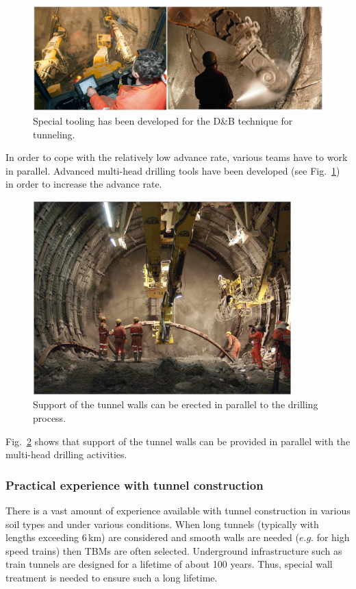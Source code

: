 \begin{figure}[htbp!]
\centering
\includegraphics[width=16cm]{./Sec_SiteInfra/Figures/multihead.jpg}
\caption{Special tooling has been developed for the D\&B technique for tunneling.}
\label{fig:multihead}
\end{figure}
In order to cope with the relatively low advance rate, various teams
have to work in parallel. Advanced multi-head drilling tools have been
developed (see Fig.~\ref{fig:multihead}) in order to increase the advance rate.
\begin{figure}[htbp!]
\centering
\includegraphics[width=10cm]{./Sec_SiteInfra/Figures/support.jpg}
\caption{Support of the tunnel walls can be erected in parallel to the drilling process.}
\label{fig:support}
\end{figure}
Fig.~\ref{fig:support} shows that support of the tunnel walls can be provided
in parallel with the multi-head drilling activities.

\FloatBarrier
\subsubsection*{Practical experience with tunnel construction}

There is a vast amount of experience available with tunnel construction
in various soil types and under various conditions. When long tunnels (typically with
lengths exceeding 6\,km) are considered and smooth walls are needed
($e.g.$ for high speed trains) then TBMs are often selected. Underground
infrastructure such as train tunnels are designed for a lifetime of about
100 years. Thus, special wall treatment is needed to ensure such a long lifetime.

